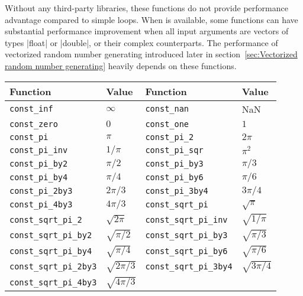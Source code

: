 Without any third-party libraries, these functions do not provide performance
advantage compared to simple loops. When \mkl is available, some functions can
have substantial performance improvement when all input arguments are vectors
of types |float| or |double|, or their complex counterparts. The performance of
vectorized random number generating introduced later in
section~\ref{sec:Vectorized random number generating} heavily depends on these
functions.

\begin{table}
  \begin{tabularx}{\textwidth}{p{1.25in}Lp{1.25in}L}
    \toprule
    Function & Value & Function & Value \\
    \midrule
    \texttt{const\_inf}            & $\infty$        &
    \texttt{const\_nan}            & NaN             \\
    \texttt{const\_zero}           & $0$             &
    \texttt{const\_one}            & $1$             \\
    \texttt{const\_pi}             & $\pi$           &
    \texttt{const\_pi\_2}          & $2\pi$          \\
    \texttt{const\_pi\_inv}        & $1/\pi$         &
    \texttt{const\_pi\_sqr}        & $\pi^2$         \\
    \texttt{const\_pi\_by2}        & $\pi/2$         &
    \texttt{const\_pi\_by3}        & $\pi/3$         \\
    \texttt{const\_pi\_by4}        & $\pi/4$         &
    \texttt{const\_pi\_by6}        & $\pi/6$         \\
    \texttt{const\_pi\_2by3}       & $2\pi/3$        &
    \texttt{const\_pi\_3by4}       & $3\pi/4$        \\
    \texttt{const\_pi\_4by3}       & $4\pi/3$        &
    \texttt{const\_sqrt\_pi}       & $\sqrt{\pi}$    \\
    \texttt{const\_sqrt\_pi\_2}    & $\sqrt{2\pi}$   &
    \texttt{const\_sqrt\_pi\_inv}  & $\sqrt{1/\pi}$  \\
    \texttt{const\_sqrt\_pi\_by2}  & $\sqrt{\pi/2}$  &
    \texttt{const\_sqrt\_pi\_by3}  & $\sqrt{\pi/3}$  \\
    \texttt{const\_sqrt\_pi\_by4}  & $\sqrt{\pi/4}$  &
    \texttt{const\_sqrt\_pi\_by6}  & $\sqrt{\pi/6}$  \\
    \texttt{const\_sqrt\_pi\_2by3} & $\sqrt{2\pi/3}$ &
    \texttt{const\_sqrt\_pi\_3by4} & $\sqrt{3\pi/4}$ \\
    \texttt{const\_sqrt\_pi\_4by3} & $\sqrt{4\pi/3}$ &

\end{tabularx}
\end{table}
